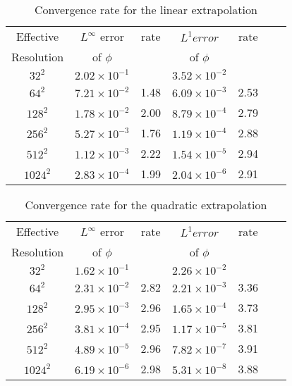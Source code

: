 \documentclass[english]{article}
\begin{document}
\begin{table}
\begin{center}
\begin{tabular}{|c|c|c|c|c|c|c|}
\hline Effective &$L^\infty$ error&rate&$L^1 error$&rate \\ Resolution& of $\phi$      &    & of
$\phi$ & \\\hline

$32^2$&$2.02\times10^{-1}$& &$3.52\times10^{-2}$&      \\\hline
$64^2$&$7.21\times10^{-2}$&1.48&$6.09\times10^{-3}$&2.53   \\\hline
$128^2$&$1.78\times10^{-2}$&2.00&$8.79\times10^{-4}$&2.79   \\\hline
$256^2$&$5.27\times10^{-3}$&1.76&$1.19\times10^{-4}$&2.88   \\\hline
$512^2$&$1.12\times10^{-3}$&2.22&$1.54\times10^{-5}$&2.94   \\\hline
$1024^2$&$2.83\times10^{-4}$&1.99&$2.04\times10^{-6}$&2.91   \\\hline
\end{tabular}
\end{center}
\caption{Convergence rate for the linear
extrapolation}\label{table_linear_extrapolation}
\end{table}


\begin{table}
\begin{center}
\begin{tabular}{|c|c|c|c|c|c|c|}
\hline Effective &$L^\infty$ error&rate&$L^1 error$&rate \\ Resolution& of $\phi$      &    & of
$\phi$ & \\\hline

$32^2$&$1.62\times10^{-1}$& &$2.26\times10^{-2}$&      \\\hline
$64^2$&$2.31\times10^{-2}$&2.82&$2.21\times10^{-3}$&3.36   \\\hline
$128^2$&$2.95\times10^{-3}$&2.96&$1.65\times10^{-4}$&3.73   \\\hline
$256^2$&$3.81\times10^{-4}$&2.95&$1.17\times10^{-5}$&3.81   \\\hline
$512^2$&$4.89\times10^{-5}$&2.96&$7.82\times10^{-7}$&3.91   \\\hline
$1024^2$&$6.19\times10^{-6}$&2.98&$5.31\times10^{-8}$&3.88   \\\hline
\end{tabular}
\end{center}
\caption{Convergence rate for the quadratic
extrapolation}\label{table_quadratic_extrapolation}
\end{table}
\end{document}
